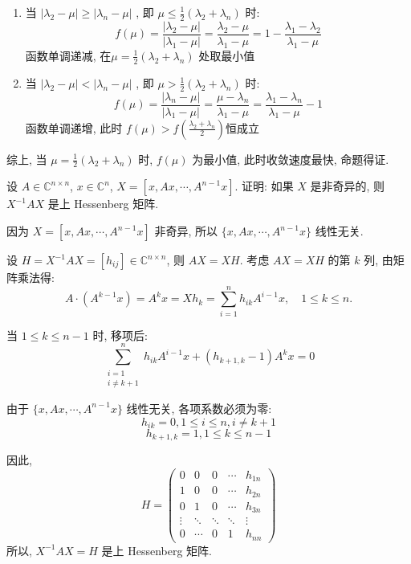 \documentclass[12pt, answers]{exam}     %
\begin{document}
\begin{questions}
\begin{solution}
\begin{enumerate}
    \item
    当 \(|\lambda_2 - \mu| \geq |\lambda_n - \mu|\) , 即 \(\mu \le \frac{1}{2}(\lambda_2 + \lambda_n)\) 时: 
    \[
    f(\mu) = \frac{|\lambda_2 - \mu|}{|\lambda_1 - \mu|} = \frac{\lambda_2 - \mu}{\lambda_1 - \mu} = 1 - \frac{\lambda_1 - \lambda_2}{\lambda_1 - \mu}  
    \]
    函数单调递减, 在\(\mu = \frac{1}{2}(\lambda_2 + \lambda_n)\) 处取最小值
    \item
    当 \(|\lambda_2 - \mu| < |\lambda_n - \mu|\) , 即 \(\mu > \frac{1}{2}(\lambda_2 + \lambda_n)\) 时: 
    \[
    f(\mu) = \frac{|\lambda_n - \mu|}{|\lambda_1 - \mu|} = \frac{\mu - \lambda_n}{\lambda_1 - \mu} = \frac{\lambda_1 - \lambda_n}{\lambda_1 - \mu} - 1
    \]
    函数单调递增, 此时 \(f(\mu) > f(\frac{\lambda_2 + \lambda_n}{2}) \)恒成立
\end{enumerate}
综上, 当 \(\mu = \frac{1}{2}(\lambda_2 + \lambda_n)\) 时, $ f(\mu) $ 为最小值, 此时收敛速度最快, 命题得证. 
\end{solution}


\question{}
设 \( A \in \mathbb{C}^{n \times n} \), \( x \in \mathbb{C}^n \), \( X = [x, Ax, \cdots, A^{n-1}x] \). 证明: 如果 \( X \) 是非奇异的, 则 \( X^{-1}AX \) 是上 Hessenberg 矩阵. 

\begin{solution}
因为 \( X = [x, Ax, \cdots, A^{n-1}x] \) 非奇异, 所以 \(\{x, Ax, \cdots, A^{n-1}x\}\) 线性无关. 

设 \( H = X^{-1}AX = [h_{ij}] \in \mathbb{C}^{n \times n} \), 则 \( AX = XH \). 
考虑 \( AX = XH \) 的第 \( k \) 列, 由矩阵乘法得: 
\[
A \cdot (A^{k-1}x) = A^k x = X h_{k} = \sum_{i=1}^{n} h_{ik} A^{i-1}x, \quad 1 \leq k \leq n. 
\]

当 \( 1 \leq k \leq n-1 \) 时, 
移项后: 
\[
\sum_{\substack{i=1 \\ i \neq k+1}}^{n} h_{ik} A^{i-1}x + (h_{k+1, k} - 1) A^k x = 0
\]

由于 \(\{x, Ax, \cdots, A^{n-1}x\}\) 线性无关, 各项系数必须为零: 
\[
h_{ik} = 0, 1 \le i \le n, i \neq k+1
\]
\[
h_{k+1, k} = 1, 1 \le k \le n - 1
\]

因此, 
\[
H = \begin{pmatrix}
0 & 0 & 0 & \cdots & h_{1n} \\
1 & 0 & 0 & \cdots & h_{2n} \\
0 & 1 & 0 & \cdots & h_{3n} \\
\vdots & \ddots & \ddots & \ddots & \vdots \\
0 & \cdots & 0 & 1 & h_{nn}
\end{pmatrix}
\]
所以, \( X^{-1}AX = H \) 是上 Hessenberg 矩阵.
\end{solution}



\end{questions}
\end{document}
